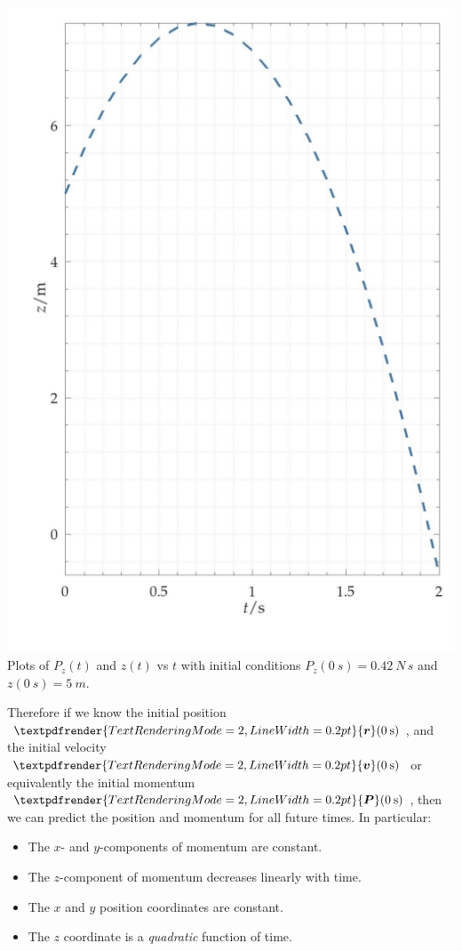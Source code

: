\documentclass[a4paper,12pt,%
onecolumn,oneside,%
british%
]{memoir}
\renewcommand*{\bm}[1]{\textpdfrender{TextRenderingMode=2,LineWidth=0.2pt}{\boldsymbol{#1}}}
\renewcommand*{\|}[1][]{\nonscript\:#1\vert\nonscript\:\mathopen{}}
\newcommand*{\yr}{\bm{r}}
\newcommand*{\yv}{\bm{v}}
\newcommand*{\yP}{\bm{P}}
\begin{document}
{\includegraphics[width=\linewidth]{images/tball_z.jpg}%
\\[\jot]\footnotesize\flushleftright\color{mpcolor}%
Plots of $P_{z}(t)$ and $z(t)$ vs $t$ with initial conditions
$P_{z}(\qty{0}{s}) = \qty{0.42}{N\,s}$ and 
$z(\qty{0}{s}) = \qty{5}{m}$.
}%

\medskip

Therefore if we know the initial position $\yr(\qty{0}{s})$, and the initial velocity $\yv(\qty{0}{s})$ or equivalently the initial momentum $\yP(\qty{0}{s})$, then we can predict the position and momentum for all future times. In particular:
\begin{itemize}
\item The $x$- and $y$-components of momentum are constant.
\item The $z$-component of momentum decreases linearly with time.
\item The $x$ and $y$ position coordinates are constant.
\item The $z$ coordinate is a \emph{quadratic} function of time.
\end{itemize}
\end{document}
